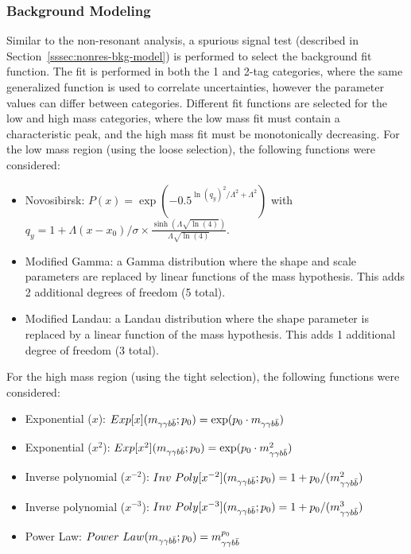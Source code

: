   


\subsubsection{Background Modeling}\label{sssec:res-bkg-model}

Similar to the non-resonant analysis, a spurious signal test (described in Section~\ref{sssec:nonres-bkg-model}) is performed to select the background fit function. The fit is performed in both the 1 and 2-tag categories, where the same generalized function is used to correlate uncertainties, however the parameter values can differ between categories. Different fit functions are selected for the low and high mass categories, where the low mass fit must contain a characteristic peak, and the high mass fit must be monotonically decreasing. For the low mass region (using the loose selection), the following functions were considered:

\begin{itemize}
  \item Novosibirsk: ${P(x) = \exp(-0.5^{\ln(q_y)^2 / \Lambda^2 + \Lambda^2})}$ with ${q_{y} = 1 + \Lambda(x-x_0)/\sigma \times \frac{\sinh(\Lambda \sqrt{\ln(4)})}{\Lambda \sqrt{\ln(4)}}}$.
  \item Modified Gamma: a Gamma distribution where the shape and scale parameters are replaced by linear functions of the mass hypothesis. This adds 2 additional degrees of freedom (5 total).
  \item Modified Landau: a Landau distribution where the shape parameter is replaced by a linear function of the mass hypothesis. This adds 1 additional degree of freedom (3 total).
\end{itemize}


For the high mass region (using the tight selection), the following functions were considered:
\begin{itemize}
  \item Exponential ($x$): ${Exp[x](m_{\gamma\gamma b\bar{b}};p_0) = \exp(p_0 \cdot m_{\gamma\gamma b\bar{b}})}$
  \item Exponential ($x^2$): ${Exp[x^2](m_{\gamma\gamma b\bar{b}};p_0) = \exp(p_0 \cdot m_{\gamma\gamma b\bar{b}}^{2})}$
  \item Inverse polynomial ($x^{-2}$): ${Inv\ Poly [x^{-2}](m_{\gamma\gamma b\bar{b}};p_0) = 1 +p_0/(m_{\gamma\gamma b\bar{b}}^{2})}$
  \item Inverse polynomial ($x^{-3}$): ${Inv\ Poly [x^{-3}](m_{\gamma\gamma b\bar{b}};p_0) = 1 +p_0/(m_{\gamma\gamma b\bar{b}}^{3})}$
  \item Power Law: ${Power\ Law(m_{\gamma\gamma b\bar{b}};p_0) = m_{\gamma\gamma b\bar{b}}^{p_0}}$
\end{itemize}

